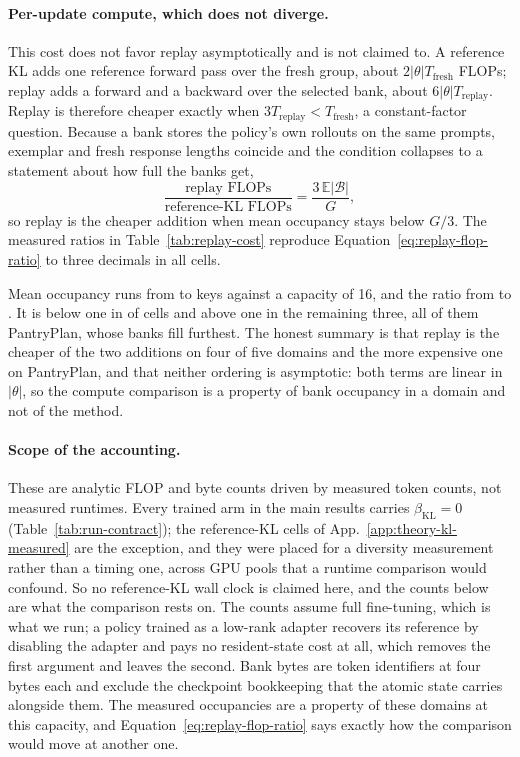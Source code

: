 \documentclass{article}
\newcommand{\1}{\mathbf 1}
\newcommand{\E}{\mathbb E}
\theoremstyle{remark}
\theoremstyle{definition}
\theoremstyle{plain}
\begin{document}
\paragraph{Per-update compute, which does not diverge.}
This cost does not favor replay asymptotically and is not claimed to. A
reference KL adds one reference forward pass over the fresh group, about
$2|\theta|T_{\mathrm{fresh}}$ FLOPs; replay adds a forward and a backward over
the selected bank, about $6|\theta|T_{\mathrm{replay}}$. Replay is therefore
cheaper exactly when $3T_{\mathrm{replay}}<T_{\mathrm{fresh}}$, a
constant-factor question. Because a bank stores the policy's own rollouts on
the same prompts, exemplar and fresh response lengths coincide and the
condition collapses to a statement about how full the banks get,
\begin{equation}
  \frac{\text{replay FLOPs}}{\text{reference-KL FLOPs}}
  =\frac{3\,\E|\mathcal B|}{G},
  \label{eq:replay-flop-ratio}
\end{equation}
so replay is the cheaper addition when mean occupancy stays below $G/3$. The
measured ratios in Table~\ref{tab:replay-cost} reproduce
Equation~\eqref{eq:replay-flop-ratio} to three decimals in all
\MDcostCellsTotal{} cells.

Mean occupancy runs from \MDcostOccMin{} to \MDcostOccMax{} keys against a
capacity of 16, and the ratio from \MDcostRatioMin{} to \MDcostRatioMax{}.
It is below one in \MDcostCellsBelow{} of \MDcostCellsTotal{} cells and above
one in the remaining three, all of them PantryPlan, whose banks fill furthest.
The honest summary is that replay is the cheaper of the two additions on four
of five domains and the more expensive one on PantryPlan, and that neither
ordering is asymptotic: both terms are linear in $|\theta|$, so the compute
comparison is a property of bank occupancy in a domain and not of the method.

\paragraph{Scope of the accounting.}
These are analytic FLOP and byte counts driven by measured token counts, not
measured runtimes. Every trained arm in the main results carries
$\beta_{\mathrm{KL}}=0$ (Table~\ref{tab:run-contract}); the reference-KL cells
of App.~\ref{app:theory-kl-measured} are the exception, and they were placed
for a diversity measurement rather than a timing one, across GPU pools that a
runtime comparison would confound. So no reference-KL wall clock is claimed
here, and the counts below are what the comparison rests on. The counts assume full
fine-tuning, which is what we run; a policy trained as a low-rank adapter
recovers its reference by disabling the adapter and pays no resident-state cost
at all, which removes the first argument and leaves the second. Bank bytes are
token identifiers at four bytes each and exclude the checkpoint bookkeeping
that the atomic state carries alongside them. The measured occupancies are a
property of these domains at this capacity, and
Equation~\eqref{eq:replay-flop-ratio} says exactly how the comparison would
move at another one.
\end{document}
